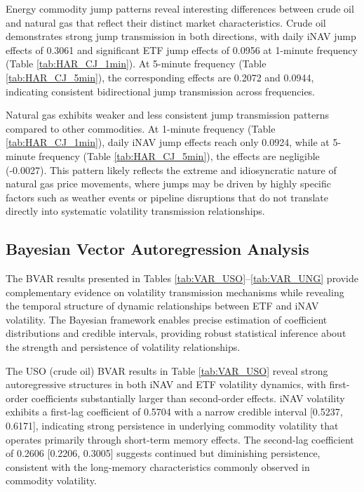 Energy commodity jump patterns reveal interesting differences between crude oil and natural gas that reflect their distinct market characteristics. Crude oil demonstrates strong jump transmission in both directions, with daily iNAV jump effects of 0.3061 and significant ETF jump effects of 0.0956 at 1-minute frequency (Table \ref{tab:HAR_CJ_1min}). At 5-minute frequency (Table \ref{tab:HAR_CJ_5min}), the corresponding effects are 0.2072 and 0.0944, indicating consistent bidirectional jump transmission across frequencies.

Natural gas exhibits weaker and less consistent jump transmission patterns compared to other commodities. At 1-minute frequency (Table \ref{tab:HAR_CJ_1min}), daily iNAV jump effects reach only 0.0924, while at 5-minute frequency (Table \ref{tab:HAR_CJ_5min}), the effects are negligible (-0.0027). This pattern likely reflects the extreme and idiosyncratic nature of natural gas price movements, where jumps may be driven by highly specific factors such as weather events or pipeline disruptions that do not translate directly into systematic volatility transmission relationships.

\subsection{Bayesian Vector Autoregression Analysis}

The BVAR results presented in Tables \ref{tab:VAR_USO}--\ref{tab:VAR_UNG} provide complementary evidence on volatility transmission mechanisms while revealing the temporal structure of dynamic relationships between ETF and iNAV volatility. The Bayesian framework enables precise estimation of coefficient distributions and credible intervals, providing robust statistical inference about the strength and persistence of volatility relationships.

The USO (crude oil) BVAR results in Table \ref{tab:VAR_USO} reveal strong autoregressive structures in both iNAV and ETF volatility dynamics, with first-order coefficients substantially larger than second-order effects. iNAV volatility exhibits a first-lag coefficient of 0.5704 with a narrow credible interval [0.5237, 0.6171], indicating strong persistence in underlying commodity volatility that operates primarily through short-term memory effects. The second-lag coefficient of 0.2606 [0.2206, 0.3005] suggests continued but diminishing persistence, consistent with the long-memory characteristics commonly observed in commodity volatility.

